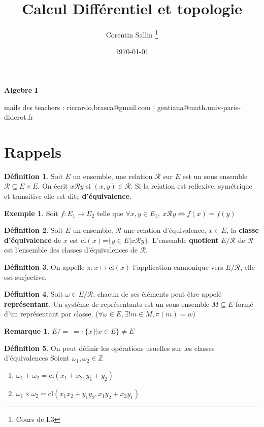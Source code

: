 \documentclass{report}
\date{\today}
\author{Corentin Sallin \thanks{Cours de L3}}
\title{Calcul Différentiel et topologie}
\newcommand{\Z}{\mathbb{Z}}
\theoremstyle{definition}
\newtheorem*{definition}{Définition}
\newtheorem*{rk}{Remarque}
\newtheorem*{example}{Exemple}
\newcommand{\itt}{\item[\(\triangleright\)]}
\begin{document}
\begin{center}
    \Huge{\textbf{Algebre I}}
\end{center}
\bigskip
mails des teachers : riccardo.brasca@gmail.com | gentiana@math.univ-paris-diderot.fr

\section*{Rappels}

\begin{definition}
    Soit \(E\) un ensemble, une relation \(\mathcal{R}\) sur \(E\) est un sous
    ensemble \(\mathcal{R}\subseteq E\times E\). On écrit \(x\mathcal{R}y\) si \((x,y)\in\mathcal{R}\).
    Si la relation est reflexive, symétrique et transitive elle est dite \textbf{d'équivalence}.
\end{definition}

\begin{example}
    Soit \(f:E_1\to E_2\) telle que \(\forall x,y\in E_1,\ x\mathcal{R}y \Leftrightarrow f(x)=f(y)\)
\end{example}

\begin{definition}
    Soit \(E\) un ensemble, \(\mathcal{R}\) une relation d'équivalence, \(x\in E\), la \textbf{classe d'équivalence} de \(x\) est cl\((x)\)=\(\{y\in E | x\mathcal{R}y\}\).
    L'ensemble \textbf{quotient} \(E/\mathcal{R}\) de \(\mathcal{R}\) est l'ensemble des classes d'équivalences de \(\mathcal{R}\).
\end{definition}

\begin{definition}
    On appelle \(\pi : x \mapsto \text{cl}(x)\) l'application cannonique vers \(E/\mathcal{R}\), elle est surjective.
\end{definition}

\begin{definition}
    Soit \(\omega\in E/\mathcal{R}\), chacun de ses éléments peut être appelé \textbf{représentant}.
    Un système de représentants est un sous ensemble \(M\subseteq E\) formé d'un représentant par classe. (\(\forall \omega\in E, \exists !m\in M, \pi(m)=w\))
\end{definition}

\begin{rk}
    \(E/=\ = \{\{x\}|x\in E\} \neq E\)
\end{rk}

\begin{definition}
    On peut définir les opérations usuelles sur les classes d'équivalences
    Soient \(\omega_1, \omega_2 \in \Z\)
    \begin{enumerate}
        \itt \(\omega_1+\omega_2=\text{cl}(x_1+x_2, y_1+y_2)\)
        \itt \(\omega_1\times\omega_2=\text{cl}(x_1x_2+y_1y_2, x_1y_2+x_2y_1)\)
    \end{enumerate}
\end{definition}
\end{document}
